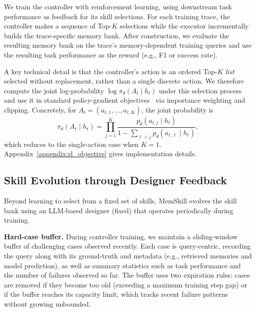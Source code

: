 We train the controller with reinforcement learning, using downstream task performance as feedback for its skill selections. For each training trace, the controller makes a sequence of Top-$K$ selections while the executor incrementally builds the trace-specific memory bank. After construction, we evaluate the resulting memory bank on the trace's memory-dependent training queries and use the resulting task performance as the reward (e.g., F1 or success rate).





A key technical detail is that the controller's action is an ordered Top-$K$ \emph{list} selected without replacement, rather than a single discrete action. We therefore compute the joint log-probability $\log \pi_\theta(A_t\mid h_t)$ under this selection process and use it in standard policy-gradient objectives~\citep{schulman2017proximal} via importance weighting and clipping. Concretely, for $A_t=(a_{t,1},\dots,a_{t,K})$, the joint probability is
\begin{equation}
\pi_\theta(A_t \mid h_t)
= \prod_{j=1}^{K}
\frac{p_\theta(a_{t,j}\mid h_t)}
{1-\sum_{\ell<j} p_\theta(a_{t,\ell}\mid h_t)} ,
\label{eq:topk_joint_prob_main}
\end{equation}
which reduces to the single-action case when $K=1$. Appendix~\ref{appendix:rl_objective} gives implementation details.




\subsection{Skill Evolution through Designer Feedback}\label{sec:designer}


Beyond learning to select from a fixed set of skills, MemSkill evolves the skill bank using an LLM-based designer (fixed) that operates periodically during training.

\textbf{Hard-case buffer.} During controller training, we maintain a sliding-window buffer of challenging cases observed recently. Each case is query-centric, recording the query along with its ground-truth and metadata (e.g., retrieved memories and model prediction), as well as summary statistics such as task performance and the number of failures observed so far.
The buffer uses two expiration rules: cases are removed if they become too old (exceeding a maximum training step gap) or if the buffer reaches its capacity limit, which tracks recent failure patterns without growing unbounded.

